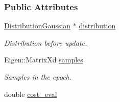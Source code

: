 \subsubsection*{Public Attributes}
\begin{DoxyCompactItemize}
\item 
\hyperlink{classDmpBbo_1_1DistributionGaussian}{Distribution\+Gaussian} $\ast$ \hyperlink{classDmpBbo_1_1UpdateSummary_a54b1ed1562d24d76c441110de5a0183f}{distribution}
\begin{DoxyCompactList}\small\item\em Distribution before update. \end{DoxyCompactList}\item 
Eigen\+::\+Matrix\+Xd \hyperlink{classDmpBbo_1_1UpdateSummary_ab0da48c0dfcd090ea3086c283e267415}{samples}
\begin{DoxyCompactList}\small\item\em Samples in the epoch. \end{DoxyCompactList}\item 
\hypertarget{classDmpBbo_1_1UpdateSummary_a1940a4e27a23d270fa5457eb65aada0f}{double \hyperlink{classDmpBbo_1_1UpdateSummary_a1940a4e27a23d270fa5457eb65aada0f}{cost\+\_\+eval}}\label{classDmpBbo_1_1UpdateSummary_a1940a4e27a23d270fa5457eb65aada0f}


\end{DoxyCompactItemize}
